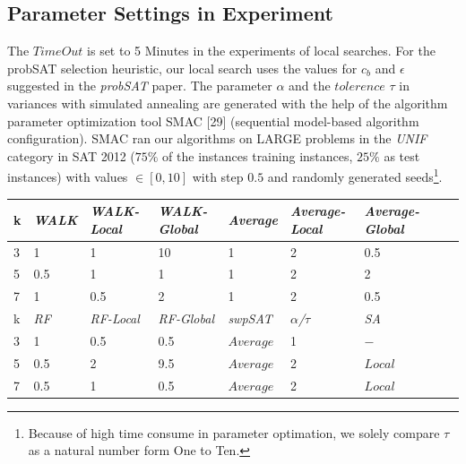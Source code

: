 \documentclass[12pt,a4paper,twoside]{scrartcl}
\numberwithin{equation}{section}
\begin{document}
\subsection{Parameter Settings in Experiment}
The $TimeOut$ is set to 5 Minutes in the experiments of local searches.  For the probSAT selection heuristic, our local search uses the values for $c_b$ and $\epsilon$ suggested in the \emph{probSAT} paper.  The parameter $\alpha$ and the $tolerence$ $ \tau$ in variances with simulated annealing are generated with the help of the algorithm parameter optimization tool SMAC [29] (sequential model-based algorithm configuration). SMAC ran our algorithms on LARGE problems in the \emph{UNIF} category in SAT 2012 ($75\%$ of the instances training instances,  $25\%$ as test instances) with values $\in [0, 10]$ with step $0.5$ and randomly generated seeds\footnote{Because of high time consume in parameter optimation, we solely compare $\tau$  as a natural number form One to Ten.}.
   \begin{table}[H]
\begin{center}
    \begin{tabular}{|l|l|l|l||l|l|l|l|p{1cm}|}
\hline 

    k &\emph{WALK}&\emph{WALK-Local}&\emph{WALK-Global}&\emph{Average}&\emph{Average-Local}&\emph{Average-Global} \\ \hline
    3 & 1& 1 & 10 &  1 & 2& 0.5       \\ \hline  
    5 & 0.5& 1 & 1&  1 & 2& 2 \\ \hline  
    7 & 1& 0.5 & 2&  1 & 2& 0.5  \\ \hline  
 \hline  
    k &\emph{RF}&\emph{RF-Local}&\emph{RF-Global}&\emph{swpSAT}&\emph{$\alpha$/$\tau$}&\emph{SA} \\ \hline  
    3 & 1& 0.5 & 0.5&$Average$ & 1 & $-$\\ \hline 
    5 & 0.5& 2& 9.5&$Average$& 2 & $Local$\\ \hline 
    7 & 0.5& 1& 0.5 &$Average$&2 & $Local$\\ \hline 

	
\end{tabular}
\end{center}
\end{table}
\end{document}
